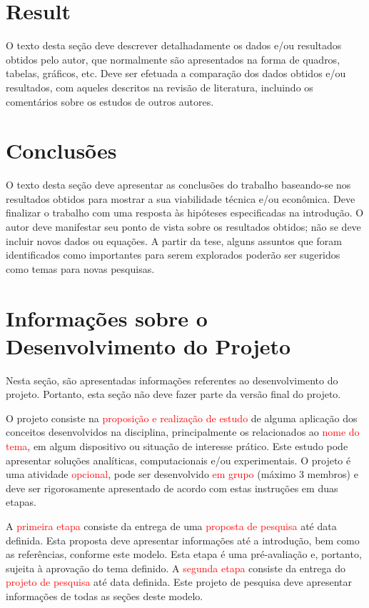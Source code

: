 \documentclass[%
  report,%
  10pt,%
  a4paper,%
  fleqn,%
  oneside,%
  sumario = tradicional,%
  chapter = TITLE,%
  section = TITLE,%
]{abntex2}
\begin{document}
\section{Result}\label{sec:res}

O texto desta seção deve descrever detalhadamente os dados e/ou resultados obtidos pelo autor, que normalmente são apresentados na forma de quadros, tabelas, gráficos, etc. Deve ser efetuada a comparação dos dados obtidos e/ou resultados, com aqueles descritos na revisão de literatura, incluindo os comentários sobre os estudos de outros autores.

\section{Conclusões}\label{sec:concl}

O texto desta seção deve apresentar as conclusões do trabalho baseando-se nos resultados obtidos para mostrar a sua viabilidade técnica e/ou econômica. Deve finalizar o trabalho com uma resposta às hipóteses especificadas na introdução. O autor deve manifestar seu ponto de vista sobre os resultados obtidos; não se deve incluir novos dados ou equações. A partir da tese, alguns assuntos que foram identificados como importantes para serem explorados poderão ser sugeridos como temas para novas pesquisas.

\section{Informações sobre o Desenvolvimento do Projeto}\label{sec:infoproj}

Nesta seção, são apresentadas informações referentes ao desenvolvimento do projeto. Portanto, esta seção não deve fazer parte da versão final do projeto.

O projeto consiste na \textcolor{red}{proposição e realização de estudo} de alguma aplicação dos conceitos desenvolvidos na disciplina, principalmente os relacionados ao \textcolor{red}{nome do tema}, em algum dispositivo ou situação de interesse prático. Este estudo pode apresentar soluções analíticas, computacionais e/ou experimentais. O projeto é uma atividade \textcolor{red}{opcional}, pode ser desenvolvido \textcolor{red}{em grupo} (máximo 3 membros) e deve ser rigorosamente apresentado de acordo com estas instruções em duas etapas.

A \textcolor{red}{primeira etapa} consiste da entrega de uma \textcolor{red}{proposta de pesquisa} até data definida. Esta proposta deve apresentar informações até a introdução, bem como as referências, conforme este modelo. Esta etapa é uma pré-avaliação e, portanto, sujeita à aprovação do tema definido. A \textcolor{red}{segunda etapa} consiste da entrega do \textcolor{red}{projeto de pesquisa} até data definida. Este projeto de pesquisa deve apresentar informações de todas as seções deste modelo.
\end{document}

